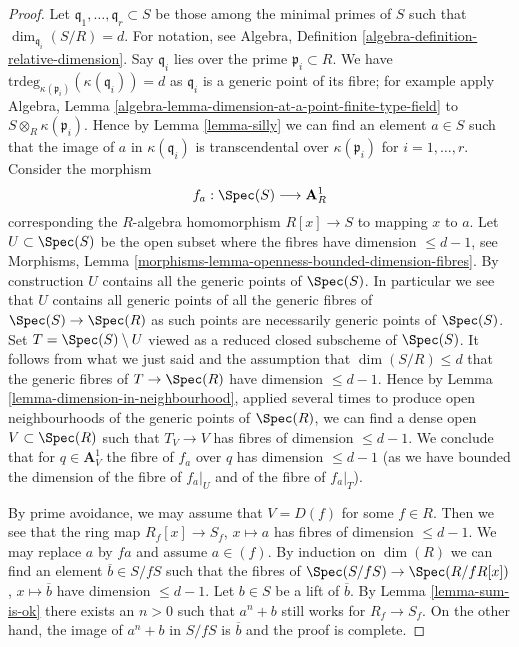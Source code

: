 \begin{proof}
\medskip\noindent
Let $\mathfrak q_1, \ldots, \mathfrak q_r \subset S$ be those
among the minimal primes of $S$ such that $\dim_{\mathfrak q_i}(S/R) = d$.
For notation, see
Algebra, Definition \ref{algebra-definition-relative-dimension}.
Say $\mathfrak q_i$ lies over the prime $\mathfrak p_i \subset R$.
We have $\text{trdeg}_{\kappa(\mathfrak p_i)}(\kappa(\mathfrak q_i)) = d$
as $\mathfrak q_i$ is a generic point of its fibre; for example
apply Algebra, Lemma \ref{algebra-lemma-dimension-at-a-point-finite-type-field}
to $S \otimes_R \kappa(\mathfrak p_i)$.
Hence by Lemma \ref{lemma-silly} we can find an element $a \in S$ such that
the image of $a$ in $\kappa(\mathfrak q_i)$ is transcendental over
$\kappa(\mathfrak p_i)$ for $i = 1, \ldots, r$.
Consider the morphism
$$
f_a : \Spec(S) \longrightarrow \mathbf{A}^1_R
$$
corresponding the $R$-algebra homomorphism $R[x] \to S$
to mapping $x$ to $a$. Let $U \subset \Spec(S)$ be the open
subset where the fibres have dimension $\leq d - 1$, see
Morphisms, Lemma \ref{morphisms-lemma-openness-bounded-dimension-fibres}.
By construction $U$ contains all the generic points of $\Spec(S)$.
In particular we see that $U$ contains all generic points of
all the generic fibres of $\Spec(S) \to \Spec(R)$ as such points are
necessarily generic points of $\Spec(S)$. Set $T = \Spec(S) \setminus U$
viewed as a reduced closed subscheme of $\Spec(S)$.
It follows from what we just said and the assumption that
$\dim(S/R) \leq d$ that
the generic fibres of $T \to \Spec(R)$ have dimension $\leq d - 1$.
Hence by Lemma \ref{lemma-dimension-in-neighbourhood},
applied several times to produce open neighbourhoods of the generic
points of $\Spec(R)$, we can find a dense open $V \subset \Spec(R)$ such that
$T_V \to V$ has fibres of dimension $\leq d - 1$.
We conclude that for $q \in \mathbf{A}^1_V$ the fibre of
$f_a$ over $q$ has dimension $\leq d - 1$ (as we have bounded the dimension
of the fibre of $f_a|_U$ and of the fibre of $f_a|_T$).

\medskip\noindent
By prime avoidance, we may assume that $V = D(f)$ for some $f \in R$.
Then we see that the ring map $R_f[x] \to S_f$, $x \mapsto a$
has fibres of dimension $\leq d - 1$.
We may replace $a$ by $fa$ and assume $a \in (f)$.
By induction on $\dim(R)$ we can find an element
$\overline{b} \in S/fS$
such that the fibres of $\Spec(S/fS) \to \Spec(R/fR[x])$,
$x \mapsto \overline{b}$ have dimension $\leq d - 1$.
Let $b \in S$ be a lift of $\overline{b}$.
By Lemma \ref{lemma-sum-is-ok} there exists an $n > 0$ such
that $a^n + b$ still works for $R_f \to S_f$.
On the other hand, the image of $a^n + b$ in $S/fS$ is $\overline{b}$
and the proof is complete.
\end{proof}













